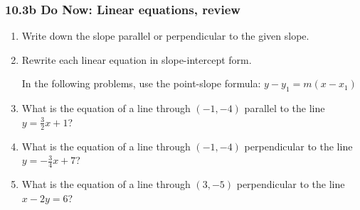 \documentclass[12pt, twoside]{article}
\begin{document}
\subsubsection*{10.3b Do Now: Linear equations, review}
  \begin{enumerate}

  \item Write down the slope parallel or perpendicular to the given slope. \vspace{0.5cm}
  \begin{enumerate}
  \end{enumerate}\vspace{0.15cm}

  \item Rewrite each linear equation in slope-intercept form.
  \begin{enumerate}
  \end{enumerate}  \vspace{3cm}

  In the following problems, use the point-slope formula: $y-y_1=m (x-x_1)$
  \item What is the equation of a line through $(-1,-4)$ parallel to the line $y=\frac{3}{2}x+1$?  \vspace{3cm}
  \item What is the equation of a line through $(-1,-4)$ perpendicular to the line $y=-\frac{3}{4}x+7$?  \vspace{3cm}
  \item What is the equation of a line through $(3,-5)$ perpendicular to the line $x-2y=6$?  \vspace{3cm}


\end{enumerate}
\end{document}
